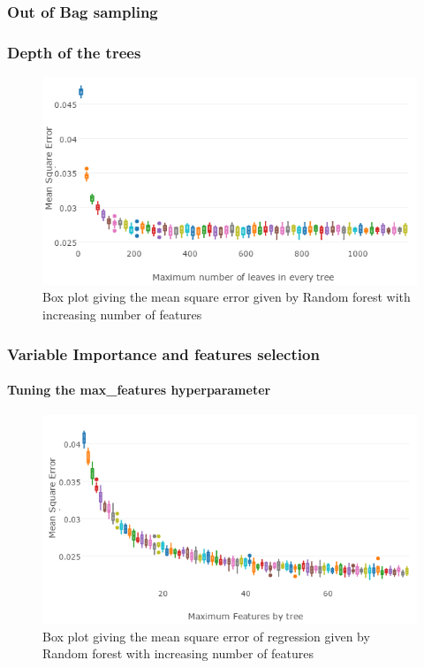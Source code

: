 \documentclass[english,11pt,openany]{article}
\theoremstyle{definition}
\theoremstyle{plain}
\theoremstyle{definition}
\begin{document}
\begin{appendices}
		
		\subsubsection{Out of Bag sampling}
		
		\subsubsection{Depth of the trees}
		
		\begin{figure}[H]
			\label{figure:mse_leaves}
			\includegraphics[scale=0.8]{RF_analysis/mse_leaves.png} 
			\caption{Box plot giving the mean square error given by Random forest with increasing number of features}
		\end{figure}
		
		\subsubsection{Variable Importance and features selection} 
		
		
		\paragraph{Tuning the max\_features hyperparameter}
		
		
		\begin{figure}[H]
			\label{figure:mse_feature}
			\includegraphics[scale=0.8]{RF_analysis/mse_features.png} 
			\caption{Box plot giving the mean square error of regression given by Random forest with increasing number of features}
		\end{figure}
		

\end{appendices}
\end{document}
